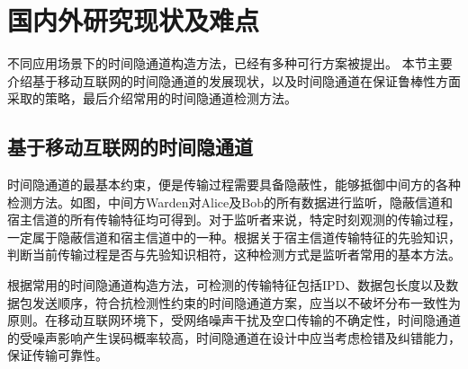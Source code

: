 \section{国内外研究现状及难点}
\label{sec:intro:background}

不同应用场景下的时间隐通道构造方法，已经有多种可行方案被提出。
本节主要介绍基于移动互联网的时间隐通道的发展现状，以及时间隐通道在保证鲁棒性方面采取的策略，最后介绍常用的时间隐通道检测方法。

\subsection{基于移动互联网的时间隐通道}
\label{sec:intro:background:ctc}

时间隐通道的最基本约束，便是传输过程需要具备隐蔽性，能够抵御中间方的各种检测方法。如图，中间方Warden对Alice及Bob的所有数据进行监听，隐蔽信道和宿主信道的所有传输特征均可得到。对于监听者来说，特定时刻观测的传输过程，一定属于隐蔽信道和宿主信道中的一种。根据关于宿主信道传输特征的先验知识，判断当前传输过程是否与先验知识相符，这种检测方式是监听者常用的基本方法。

根据常用的时间隐通道构造方法，可检测的传输特征包括IPD、数据包长度以及数据包发送顺序，符合抗检测性约束的时间隐通道方案，应当以不破坏分布一致性为原则。在移动互联网环境下，受网络噪声干扰及空口传输的不确定性，时间隐通道的受噪声影响产生误码概率较高，时间隐通道在设计中应当考虑检错及纠错能力，保证传输可靠性。


